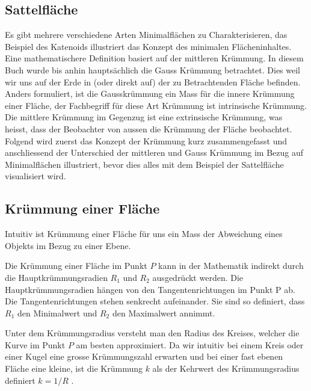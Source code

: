 \begin{refsection}
\section{Sattelfläche}
Es gibt mehrere verschiedene Arten Minimalflächen zu Charakterisieren, das Beispiel des Katenoids illustriert das Konzept des minimalen Flächeninhaltes. 
Eine mathematischere Definition basiert auf der mittleren Krümmung. 
In diesem Buch wurde bis anhin hauptsächlich die Gauss Krümmung betrachtet. 
Dies weil wir uns auf der Erde in (oder direkt auf) der zu Betrachtenden Fläche befinden. 
Anders formuliert, ist die Gausskrümmung ein Mass für die innere Krümmung einer Fläche, der Fachbegriff für diese Art Krümmung ist intrinsische Krümmung. 
Die mittlere Krümmung im Gegenzug ist eine extrinsische Krümmung, was heisst, dass der Beobachter von aussen die Krümmung der Fläche beobachtet.
Folgend wird zuerst das Konzept der Krümmung kurz zusammengefasst und anschliessend der Unterschied der mittleren und Gauss Krümmung im Bezug auf Minimalflächen illustriert, bevor dies alles mit dem Beispiel der Sattelfläche visualisiert wird.


\subsection{Krümmung einer Fläche}

Intuitiv ist Krümmung einer Fläche für uns ein Mass der Abweichung eines Objekts im Bezug zu einer Ebene. 

Die Krümmung einer Fläche im Punkt $P$ kann in der Mathematik indirekt durch die Hauptkrümmungsradien $R_1$ und $R_2$ ausgedrückt werden. 
Die Hauptkrümmungsradien hängen von den Tangentenrichtungen im Punkt P ab. 
Die Tangentenrichtungen stehen senkrecht aufeinander.
Sie sind so definiert, dass $R_1$ den Minimalwert und $R_2$ den Maximalwert annimmt.

Unter dem Krümmungsradius versteht man den Radius des Kreises, welcher die Kurve im Punkt $P$ am besten approximiert. 
Da wir intuitiv bei einem Kreis oder einer Kugel eine grosse Krümmungszahl erwarten und bei einer fast ebenen Fläche eine kleine, ist die Krümmung $k$  als der Kehrwert des Krümmungsradius definiert $k=1/R$ . 


\end{refsection}
